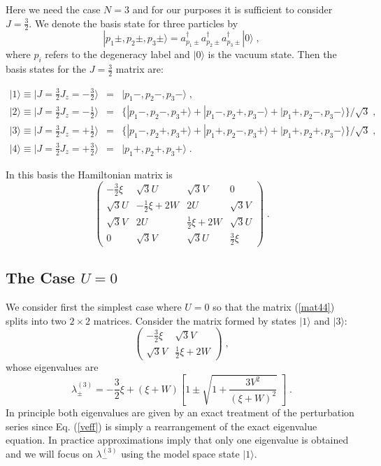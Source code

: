 \documentclass[prc,aps,amsmath,amssymb,preprintnumbers,showpacs,twocolumn]{revtex4}
\def\thalf{{\textstyle{\frac{1}{2}}}}
\def\threehalf{{\textstyle{\frac{3}{2}}}}
\newcommand{\bq}{\begin{eqnarray}}
\newcommand{\eq}{\end{eqnarray}}
\begin{document}
Here we need the case $N=3$ and for our purposes it is sufficient
to consider $J=\threehalf$.
We denote the basis state for three particles by
\begin{equation}
|p_1\pm,p_2\pm,p_3\pm\rangle=a^\dagger_{p_1\pm}a^\dagger_{p_2\pm}
a^\dagger_{p_3\pm}|0\rangle\;,
\end{equation}
where $p_i$ refers to the degeneracy label and $|0\rangle$ is the 
vacuum state. Then the basis states for the $J=\threehalf$ matrix are:
\begin{widetext}
\vspace{-.7cm}
\bq
|1\rangle\equiv|J=\threehalf J_z=-\threehalf\rangle
&=&|p_1-,p_2-,p_3-\rangle\;,\nonumber\\
|2\rangle\equiv|J=\threehalf J_z=-\thalf\rangle
&=&\bigl\{|p_1-,p_2-,p_3+\rangle
+|p_1-,p_2+,p_3-\rangle+|p_1+,p_2-,p_3-\rangle\bigr\}/\sqrt{3}
\;,\nonumber\\
|3\rangle\equiv|J=\threehalf J_z=+\thalf\rangle
&=&\bigl\{|p_1-,p_2+,p_3+\rangle
+|p_1+,p_2-,p_3+\rangle+|p_1+,p_2+,p_3-\rangle\bigr\}/\sqrt{3}
\;,\nonumber\\
|4\rangle\equiv|J=\threehalf J_z=+\threehalf\rangle
&=&|p_1+,p_2+,p_3+\rangle\;.\label{3basis}
\eq
\end{widetext}
\vspace{-.2cm}
In this basis the Hamiltonian matrix is 
\begin{equation}
\left(\begin{array}{cccc}
-\threehalf\xi&\sqrt{3}U&\sqrt{3}V&0\\[0.5mm]
\sqrt{3}U&-\thalf\xi+2W&2U&\sqrt{3}V\\
\sqrt{3}V&2U&\thalf\xi+2W&\sqrt{3}U\\
0&\sqrt{3}V&\sqrt{3}U&\threehalf\xi
\end{array}\right)\;. \label{mat44}
\end{equation}

\subsection{The Case $U=0$\label{subsecu0}}

We consider first the simplest case where $U=0$ so that the matrix 
(\ref{mat44}) splits into two $2\times2$ matrices. Consider the matrix
formed by states $|1\rangle$ and $|3\rangle$:
\begin{equation}
\left(\begin{array}{cc}
-\threehalf\xi&\sqrt{3}V\\[0.5mm]
\sqrt{3}V&\thalf\xi+2W
\end{array}\right)\;, \label{mat22}
\end{equation}
whose eigenvalues are
\begin{equation}
\lambda_\pm^{(3)}=-\threehalf\xi
+(\xi+W)\left[1\pm\sqrt{1+\frac{3V^2}{(\xi+W)^2}}\;\right]\;.
\label{ex3u0} 
\end{equation}
In principle both eigenvalues are given by an exact treatment 
of the perturbation series \cite{suz} since Eq. (\ref{veff}) is 
simply a rearrangement of the 
exact eigenvalue equation. In practice approximations imply that only
one eigenvalue is obtained and we will focus on $\lambda_-^{(3)}$ using
the model space state $|1\rangle$. 
\end{document}
